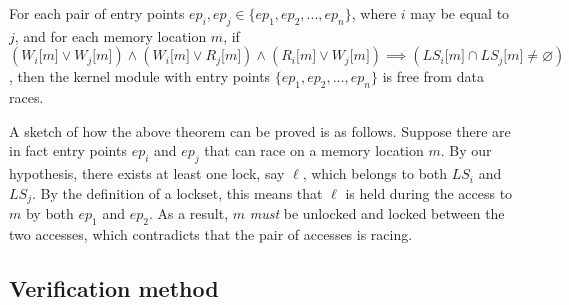 \begin{theorem}
\label{theorem:locksets}
For each pair of entry points $\mathit{ep}_{i}, \mathit{ep}_{j}\in \{\mathit{ep}_{1}, \mathit{ep}_{2}, ..., \mathit{ep}_{n}\}$, where $i$ may be equal to $j$, and for each memory location $m$, if $(W_{i}\lbrack m\rbrack \vee W_{j}\lbrack m\rbrack) \wedge (W_{i}\lbrack m\rbrack \vee R_{j}\lbrack m\rbrack) \wedge (R_{i}\lbrack m\rbrack \vee W_{j}\lbrack m\rbrack) \implies (\mathit{LS}_{i}\lbrack m\rbrack \cap \mathit{LS}_{j}\lbrack m\rbrack \not= \varnothing)$, then the kernel module with entry points $\{\mathit{ep}_{1}, \mathit{ep}_{2}, \dotsc, \mathit{ep}_{n}\}$ is free from data races.
\end{theorem}

A sketch of how the above theorem can be proved is as follows. Suppose there are in fact entry points $\mathit{ep}_{i}$ and $\mathit{ep}_{j}$ that can race on a memory location $m$. By our hypothesis, there exists at least one lock, say $\ell$, which belongs to both $\mathit{LS}_{i}$ and $\mathit{LS}_{j}$. By the definition of a lockset, this means that $\ell$ is held during the access to $m$ by both $ep_1$ and $ep_2$. As a result, $m$ \emph{must} be unlocked and locked between the two accesses, which contradicts that the pair of accesses is racing.

\subsection{Verification method}
\label{method}

